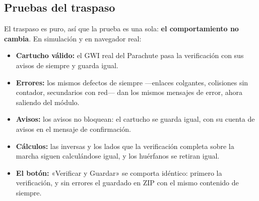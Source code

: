 \subsection{Pruebas del traspaso}
\label{sec:F5I5Pruebas}

El traspaso es puro, así que la prueba es una sola:
\textbf{el comportamiento no cambia}. En simulación y en
navegador real:

\begin{itemize}
	\item \textbf{Cartucho válido:} el GWI real del Parachute pasa
	la verificación con sus avisos de siempre y guarda igual.
	
	\item \textbf{Errores:} los mismos defectos de siempre —enlaces
	colgantes, colisiones sin contador, secundarios con red— dan
	los mismos mensajes de error, ahora saliendo del módulo.
	
	\item \textbf{Avisos:} los avisos no bloquean: el cartucho se
	guarda igual, con su cuenta de avisos en el mensaje de
	confirmación.
	
	\item \textbf{Cálculos:} las inversas y los lados que la
	verificación completa sobre la marcha siguen calculándose
	igual, y los huérfanos se retiran igual.
	
	\item \textbf{El botón:} «Verificar y Guardar» se comporta
	idéntico: primero la verificación, y sin errores el guardado
	en ZIP con el mismo contenido de siempre.
\end{itemize}

